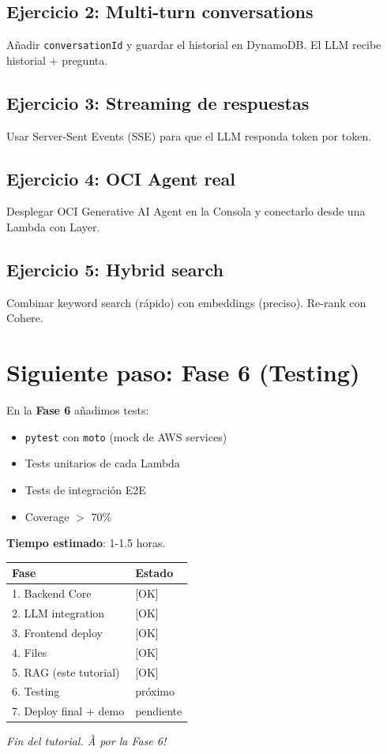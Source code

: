 \documentclass[11pt,a4paper,oneside]{article}
\begin{document}
\subsection{Ejercicio 2: Multi-turn conversations}

A\~nadir \texttt{conversationId} y guardar el historial en DynamoDB. El LLM recibe historial + pregunta.

\subsection{Ejercicio 3: Streaming de respuestas}

Usar Server-Sent Events (SSE) para que el LLM responda token por token.

\subsection{Ejercicio 4: OCI Agent real}

Desplegar OCI Generative AI Agent en la Consola y conectarlo desde una Lambda con Layer.

\subsection{Ejercicio 5: Hybrid search}

Combinar keyword search (r\'apido) con embeddings (preciso). Re-rank con Cohere.

\section{Siguiente paso: Fase 6 (Testing)}

En la \textbf{Fase 6} a\~nadimos tests:

\begin{itemize}
  \item \texttt{pytest} con \texttt{moto} (mock de AWS services)
  \item Tests unitarios de cada Lambda
  \item Tests de integraci\'on E2E
  \item Coverage $>$ 70\%
\end{itemize}

\textbf{Tiempo estimado}: 1-1.5 horas.

\begin{center}
\begin{tabular}{ll}
\toprule
Fase & Estado \\
\midrule
1. Backend Core & [OK] \\
2. LLM integration & [OK] \\
3. Frontend deploy & [OK] \\
4. Files & [OK] \\
5. RAG (este tutorial) & [OK] \\
6. Testing & pr\'oximo \\
7. Deploy final + demo & pendiente \\
\bottomrule
\end{tabular}
\end{center}

\vspace{2em}
\begin{center}
\textit{Fin del tutorial. \`A por la Fase 6!}
\end{center}
\end{document}
